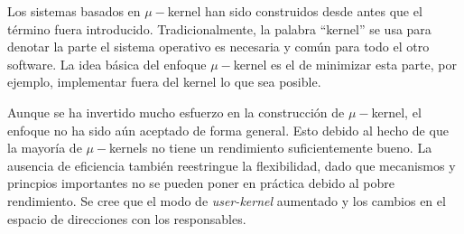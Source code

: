 Los sistemas basados en $\mu-$kernel han sido construidos desde antes que el término fuera introducido. Tradicionalmente, la palabra ``kernel'' se usa para denotar la parte el sistema operativo es necesaria y común para todo el otro software. La idea básica del enfoque $\mu-$kernel es el de minimizar esta parte, por ejemplo, implementar fuera del kernel lo que sea posible.

Aunque se ha invertido mucho esfuerzo en la construcción de $\mu-$kernel, el enfoque no ha sido aún aceptado de forma general. Esto debido al hecho de que la mayoría de $\mu-$kernels no tiene un rendimiento suficientemente bueno. La ausencia de eficiencia también reestringue la flexibilidad, dado que mecanismos y princpios importantes no se pueden poner en práctica debido al pobre rendimiento. Se cree que el modo de \textit{user-kernel} aumentado y los cambios en el espacio de direcciones con los responsables.

